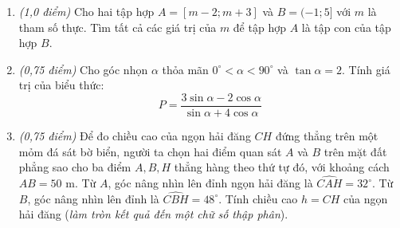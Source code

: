 \documentclass[12pt,a4paper]{article}
\begin{document}
\begin{enumerate}[resume]
\item \textit{(1,0 điểm)} Cho hai tập hợp $A = [m - 2; m + 3]$ và $B = (-1; 5]$ với $m$ là tham số thực. Tìm tất cả các giá trị của $m$ để tập hợp $A$ là tập con của tập hợp $B$.

\item \textit{(0,75 điểm)} Cho góc nhọn $\alpha$ thỏa mãn $0^\circ < \alpha < 90^\circ$ và $\tan \alpha = 2$. Tính giá trị của biểu thức:
\[
P = \dfrac{3\sin \alpha - 2\cos \alpha}{\sin \alpha + 4\cos \alpha}
\]

\item \begin{minipage}[t]{0.58\linewidth}
\textit{(0,75 điểm)} Để đo chiều cao của ngọn hải đăng $CH$ đứng thẳng trên một mỏm đá sát bờ biển, người ta chọn hai điểm quan sát $A$ và $B$ trên mặt đất phẳng sao cho ba điểm $A, B, H$ thẳng hàng theo thứ tự đó, với khoảng cách $AB = 50\text{ m}$. Từ $A$, góc nâng nhìn lên đỉnh ngọn hải đăng là $\widehat{CAH} = 32^\circ$. Từ $B$, góc nâng nhìn lên đỉnh là $\widehat{CBH} = 48^\circ$. Tính chiều cao $h = CH$ của ngọn hải đăng (\textit{làm tròn kết quả đến một chữ số thập phân}).
\end{minipage}\hfill
\begin{minipage}[t]{0.38\linewidth}
\centering
{}
\end{minipage}


\end{enumerate}
\end{document}
